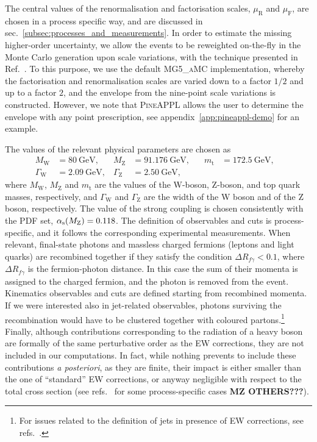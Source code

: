 The central values of the renormalisation and factorisation scales, $\mu_\mathrm{R}$ and
$\mu_\mathrm{F}$, are chosen in a process specific way, and are discussed in sec.~\ref{subsec:processes_and_measurements}. In order to estimate the missing higher-order uncertainty,
we allow the events to be reweighted on-the-fly in the Monte Carlo generation upon scale
variations, with the technique presented in Ref.~\cite{Frederix:2011ss}. To this purpose, we use the default \textsc{MG5\_aMC}
implementation, whereby the factorisation and renormalisation scales
are varied down to a factor $1/2$ and up to a factor $2$, and the envelope
from the nine-point scale variations is constructed. However, we note that
\textsc{PineAPPL} allows the user to determine the envelope with any point
prescription, see appendix~\ref{app:pineappl-demo} for an example.

The values of the relevant physical parameters are chosen as
\begin{equation}
\begin{aligned}
M_\mathrm{W} &= \SI{80}{\giga\electronvolt} \text{,} \quad &
M_\mathrm{Z} &= \SI{91.176}{\giga\electronvolt} \text{,} \quad &
m_\mathrm{t} &= \SI{172.5}{\giga\electronvolt} \text{,} \quad \\
\Gamma_\mathrm{W} &= \SI{2.09}{\giga\electronvolt} \text{,} &
\Gamma_\mathrm{Z} &= \SI{2.50}{\giga\electronvolt} \text{,}
\end{aligned}
\label{eq:parameters}
\end{equation}
where $M_\mathrm{W}$, $M_\mathrm{Z}$ and $m_\mathrm{t}$ are the values of the W-boson, Z-boson, and
top quark masses, respectively, and $\Gamma_\mathrm{W}$ and $\Gamma_\mathrm{Z}$ are the width of
the W boson and of the Z boson, respectively. The value of the strong
coupling is chosen consistently with the PDF set, $\alpha_\mathrm{s}(M_\mathrm{Z})=0.118$.
The definition of observables and cuts is process-specific, and it follows the corresponding experimental measurements.
When relevant, final-state photons and massless charged fermions (leptons and light quarks) are recombined together 
if they satisfy the condition $\Delta R_{f \gamma}<0.1$, where $\Delta R_{f \gamma}$
is the fermion-photon distance. In this case the
sum of their momenta is assigned to the charged fermion, and the photon is removed
from the event. Kinematics observables and cuts are defined starting from recombined momenta. If we were interested also in jet-related observables,
photons surviving the recombination would have to be clustered together with coloured
partons.\footnote{For issues related to the definition of jets in presence of EW corrections,
see refs.~\cite{Frederix:2016ost,Denner:2019zfp}.} Finally, although contributions corresponding to the radiation
of a heavy boson are formally of the same perturbative order as the EW corrections, they are not included in our
computations. In fact, while nothing prevents to include these contributions \emph{a posteriori}, as they are finite,
their impact is either smaller than the one of ``standard'' EW corrections, or anyway negligible with respect to
the total cross section (see refs.~\cite{Frixione:2014qaa,Frixione:2015zaa,Pagani:2016caq} for some process-specific cases {\bf MZ OTHERS???}).
    

